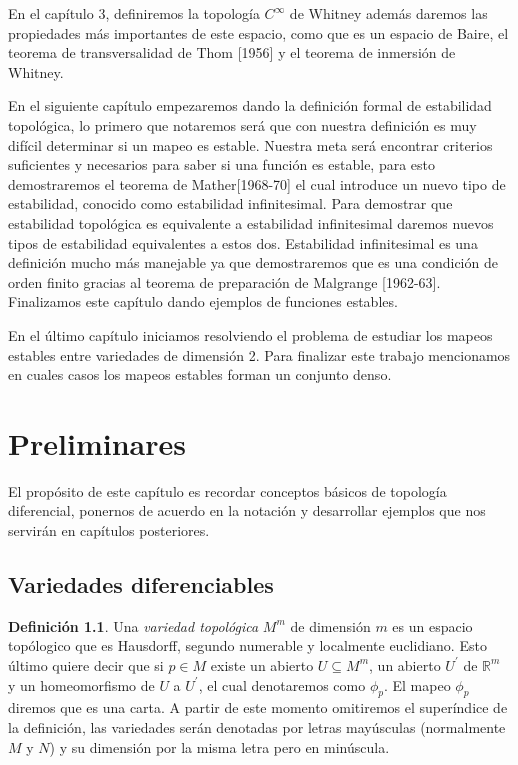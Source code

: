 \documentclass{report}
\theoremstyle{definition}
\newtheorem{defi}[theorem]{Definici\'on}
\begin{document}
En el cap\'itulo 3, definiremos la topolog\'ia $C^\infty$ de Whitney adem\'as daremos las propiedades m\'as importantes de este espacio, como que es un espacio de Baire, el teorema de transversalidad de Thom [1956] y el teorema de inmersi\'on de Whitney.

En el siguiente cap\'itulo empezaremos dando la definici\'on formal de estabilidad topol\'ogica, lo primero que notaremos ser\'a que con nuestra definici\'on es muy dif\'icil determinar si un mapeo es estable. Nuestra meta ser\'a encontrar criterios suficientes y necesarios para saber si una funci\'on es estable, para esto demostraremos el teorema de Mather[1968-70] el cual introduce un nuevo tipo de estabilidad, conocido como estabilidad infinitesimal. Para demostrar que estabilidad topol\'ogica es equivalente a estabilidad infinitesimal daremos nuevos tipos de estabilidad equivalentes a estos dos. Estabilidad infinitesimal es una definici\'on mucho m\'as manejable ya que demostraremos que es una condici\'on de orden finito gracias al teorema de preparaci\'on de Malgrange [1962-63]. Finalizamos este cap\'itulo dando ejemplos de funciones estables.

En el \'ultimo cap\'itulo iniciamos resolviendo el problema de estudiar los mapeos estables entre variedades de dimensi\'on 2. Para finalizar este trabajo mencionamos en cuales casos los mapeos estables forman un conjunto denso.

\chapter{Preliminares}

El prop\'osito de este cap\'itulo es recordar conceptos b\'asicos de topolog\'ia diferencial, ponernos de acuerdo en la notaci\'on y desarrollar ejemplos que nos servir\'an en cap\'itulos posteriores.

\section{Variedades diferenciables}

\begin{defi}
Una \textit{variedad topol\'ogica} $M^m$ de dimensi\'on $m$ es un espacio top\'ologico que es Hausdorff, segundo numerable y localmente euclidiano. Esto \'ultimo quiere decir que si $p \in M$ existe un abierto $U \subseteq M^m$, un abierto $U^\prime$ de $\mathbb{R}^m$ y un homeomorfismo de $U$ a $U^\prime$, el cual denotaremos como $\phi_p$. El mapeo $\phi_p$ diremos que es una carta. A partir de este momento omitiremos el super\'indice de la definici\'on, las variedades ser\'an denotadas por letras may\'usculas (normalmente $M$ y $N$) y su dimensi\'on por la misma letra pero en min\'uscula.
\end{defi}
\end{document}
